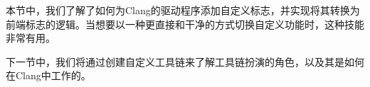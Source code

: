 本节中，我们了解了如何为Clang的驱动程序添加自定义标志，并实现将其转换为前端标志的逻辑。当想要以一种更直接和干净的方式切换自定义功能时，这种技能非常有用。
 
下一节中，我们将通过创建自定义工具链来了解工具链扮演的角色，以及其是如何在Clang中工作的。
 
 
 
 
 
 
 
 
 
 
 
 
 
 
 
 
 
 
 
 
 
 
 
 
 
 
 
 
